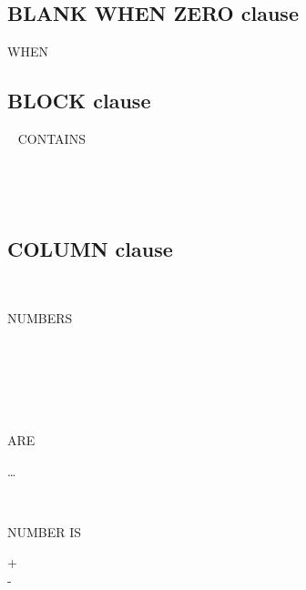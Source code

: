 \subsection{BLANK WHEN ZERO clause}
 WHEN 

\subsection{BLOCK clause}
\ {}\newline
{} CONTAINS \integer
\begin{0-1}
   \integer
\end{0-1}
\begin{0-1}
   \\
\end{0-1}\\

\subsection{COLUMN clause}

\begin{1=}
  \begin{1=}
     \\
  \end{1=}
  NUMBERS
  \begin{0-1}
     \\
  \end{0-1} \\

  \begin{1=}
     \\
  \end{1=}
  ARE
\end{1=}
\begin{1=}
  \begin{0-1}
  \end{0-1}
\integer
\end{1=}
\ldots

\begin{1=}
   \\
\end{1=}
NUMBER IS
\begin{0-1}
  + \\
  - \\
   \\
\end{0-1}
\begin{1=}
  \identifier \\
  \integer
\end{1=}

